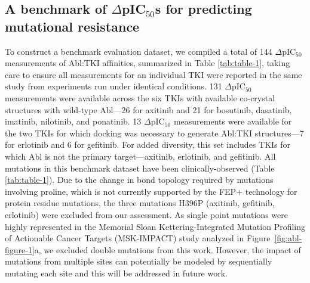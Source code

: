 \documentclass[phd,tocprelim]{cornell}
\begin{document}
\subsection{A benchmark of $\Delta$pIC$_{50}$s for predicting mutational resistance} 
  To construct a benchmark evaluation dataset, we compiled a total of 144  $\Delta$pIC$_{50}$ measurements of Abl:TKI affinities, summarized in Table \ref{tab:table-1}, taking care to ensure all measurements for an individual TKI were reported in the same study from experiments run under identical conditions.
  131 $\Delta$pIC$_{50}$ measurements were available across the six TKIs with available co-crystal structures with wild-type Abl---26 for axitinib and 21 for bosutinib, dasatinib, imatinib, nilotinib, and ponatinib.
  13 $\Delta$pIC$_{50}$ measurements were available for the two TKIs for which docking was necessary to generate Abl:TKI structures---7 for erlotinib and 6 for gefitinib. 
  For added diversity, this set includes TKIs for which Abl is not the primary target---axitinib, erlotinib, and gefitinib.
  All mutations in this benchmark dataset have been clinically-observed (Table \ref{tab:table-1}). Due to the change in bond topology required by mutations involving proline, which is not currently supported by the FEP+ technology for protein residue mutations, the three mutations H396P (axitinib, gefitinib, erlotinib) were excluded from our assessment. As single point mutations were highly represented in the Memorial Sloan
Kettering-Integrated Mutation Profiling of Actionable Cancer Targets (MSK-IMPACT) study analyzed in Figure~\ref{fig:abl-figure-1}a, we excluded double mutations from this work. However, the impact of mutations from multiple sites can potentially be modeled by sequentially mutating each site and this will be addressed in future work.

%
%
%
\end{document}
